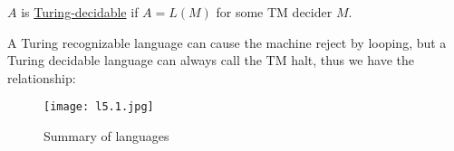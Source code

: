 \begin{definition}
    \(A\) is \underline{Turing-decidable} if \(A = L(M)\) for some TM decider \(M\).    
\end{definition}

A Turing recognizable language can cause the machine reject by looping, but a Turing decidable language can always call the TM halt, thus we have the relationship:

\begin{figure}[H]
    \centering
    \texttt{[image: l5.1.jpg]}
    \caption{Summary of languages}
\end{figure}